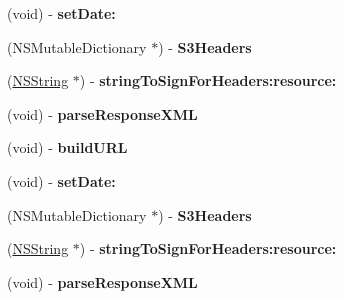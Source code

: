 \begin{DoxyCompactItemize}
\item 
\hypertarget{interface_a_s_i_s3_request_a3eb32c464e0663e896f97338e45fcbcc}{
(void) -\/ {\bfseries set\-Date\-:}}
\label{interface_a_s_i_s3_request_a3eb32c464e0663e896f97338e45fcbcc}

\item 
\hypertarget{interface_a_s_i_s3_request_ae9241f3e6890675b37ebcc612a4112b3}{
(\-N\-S\-Mutable\-Dictionary $\ast$) -\/ {\bfseries \-S3\-Headers}}
\label{interface_a_s_i_s3_request_ae9241f3e6890675b37ebcc612a4112b3}

\item 
\hypertarget{interface_a_s_i_s3_request_a6186d54d09b61de7f1929707a983a95b}{
(\hyperlink{class_n_s_string}{\-N\-S\-String} $\ast$) -\/ {\bfseries string\-To\-Sign\-For\-Headers\-:resource\-:}}
\label{interface_a_s_i_s3_request_a6186d54d09b61de7f1929707a983a95b}

\item 
\hypertarget{interface_a_s_i_s3_request_a537b485990a0b0b1cf22d122439b89e1}{
(void) -\/ {\bfseries parse\-Response\-X\-M\-L}}
\label{interface_a_s_i_s3_request_a537b485990a0b0b1cf22d122439b89e1}

\item 
\hypertarget{interface_a_s_i_s3_request_ace59aaf9a74564868fc1f426b363e5bb}{
(void) -\/ {\bfseries build\-U\-R\-L}}
\label{interface_a_s_i_s3_request_ace59aaf9a74564868fc1f426b363e5bb}

\item 
\hypertarget{interface_a_s_i_s3_request_a3eb32c464e0663e896f97338e45fcbcc}{
(void) -\/ {\bfseries set\-Date\-:}}
\label{interface_a_s_i_s3_request_a3eb32c464e0663e896f97338e45fcbcc}

\item 
\hypertarget{interface_a_s_i_s3_request_ae9241f3e6890675b37ebcc612a4112b3}{
(\-N\-S\-Mutable\-Dictionary $\ast$) -\/ {\bfseries \-S3\-Headers}}
\label{interface_a_s_i_s3_request_ae9241f3e6890675b37ebcc612a4112b3}

\item 
\hypertarget{interface_a_s_i_s3_request_a6186d54d09b61de7f1929707a983a95b}{
(\hyperlink{class_n_s_string}{\-N\-S\-String} $\ast$) -\/ {\bfseries string\-To\-Sign\-For\-Headers\-:resource\-:}}
\label{interface_a_s_i_s3_request_a6186d54d09b61de7f1929707a983a95b}

\item 
\hypertarget{interface_a_s_i_s3_request_a537b485990a0b0b1cf22d122439b89e1}{
(void) -\/ {\bfseries parse\-Response\-X\-M\-L}}
\label{interface_a_s_i_s3_request_a537b485990a0b0b1cf22d122439b89e1}


\end{DoxyCompactItemize}
